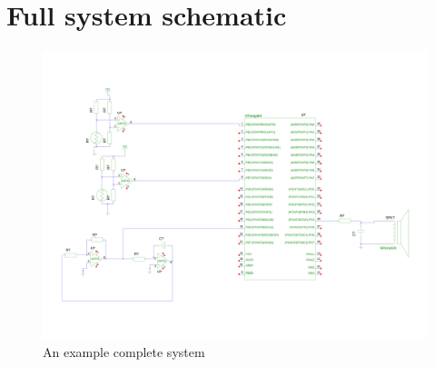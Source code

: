 \section{Full system schematic}

\begin{figure}[H]
	\centering
	\includegraphics[width=\textwidth]{./images/system.png}
	\caption{An example complete system}
	\label{app:syssch:sch}
\end{figure}
